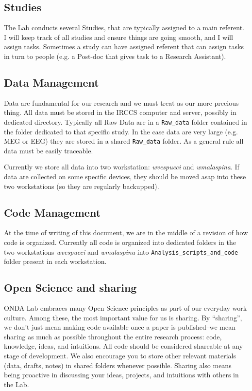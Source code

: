 \documentclass[12pt]{article}
\begin{document}
\subsection{Studies}
The Lab conducts several Studies, that are typically assigned to a main referent. I will keep track of all studies and ensure things are going smooth, and I will assign
tasks. Sometimes a study can have assigned referent that can assign tasks in turn to people (e.g. a Post-doc that gives task to a Research Assistant).

\subsection{Data Management}
Data are fundamental for our research and we must treat as our more precious thing. All data must be stored in the IRCCS computer and server, possibly in dedicated directory.
Typically all Raw Data are in a \texttt{Raw\_data} folder contained in the folder dedicated to that specific study. In the case data are very large (e.g. MEG or EEG) they are stored in a shared \texttt{Raw\_data} folder. As a general rule all data must be easily traceable.

Currently we store all data into two workstation: \emph{wvespucci} and \emph{wmalaspina}. 
If data are collected on some specific devices, they should be moved asap into these two workstations (so they are regularly backupped).

\subsection{Code Management}
At the time of writing of this document, we are in the middle of a revision of how code is organized.
Currently all code is organized into dedicated folders in the two workstations \emph{wvespucci} and \emph{wmalaspina} into \texttt{Analysis\_scripts\_and\_code} folder present in each workstation.

\subsection{Open Science and sharing}
ONDA Lab embraces many Open Science principles as part of our everyday work culture. Among these, the most important value for us is sharing.  
By ``sharing'',  we don't just mean making code available once a paper is published--we mean sharing as much as possible throughout the entire research process: code, knowledge, ideas, and intuitions.  
All code should be considered shareable at any stage of development. We also encourage you to store other relevant materials (data, drafts, notes) in shared folders whenever possible.
Sharing also means being proactive in discussing your ideas, projects, and intuitions with others in the Lab.
\end{document}
